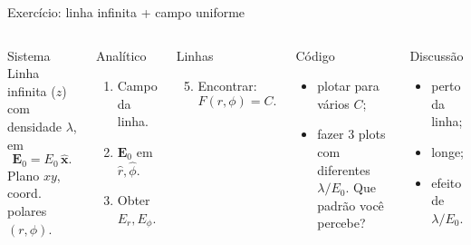 \documentclass[aspectratio=169,11pt]{beamer}
\begin{document}
\begin{frame}{Exercício: linha infinita + campo uniforme}

\footnotesize

\begin{columns}[T,onlytextwidth]


\begin{mybox}{Sistema}
Linha infinita (\(z\)) com densidade \(\lambda\), em
\[
\mathbf E_0 = E_0\,\hat{\mathbf x}.
\]
Plano \(xy\), coord. polares \((r,\phi)\).
\end{mybox}

\vspace{0.1cm}

\begin{block}{Analítico}
\begin{enumerate}
\item Campo da linha.
\item \(\mathbf E_0\) em \(\hat r,\hat\phi\).
\item Obter \(E_r, E_\phi\).

\end{enumerate}
\end{block}


\begin{block}{Linhas}
\begin{enumerate}
\setcounter{enumi}{4}
\item Encontrar:
\[
F(r,\phi)=C.
\]
\end{enumerate}
\end{block}

\vspace{0.1cm}

\begin{alertblock}{Código}
\begin{itemize}
\item plotar para vários \(C\);
\item fazer 3 plots com diferentes \(\lambda/E_0\). Que padrão você percebe?
\end{itemize}
\end{alertblock}

\vspace{0.1cm}

\begin{mybox}{Discussão}
\begin{itemize}
\item perto da linha;
\item longe;
\item efeito de \(\lambda/E_0\).
\end{itemize}
\end{mybox}

\end{columns}

\end{frame}
\end{document}
